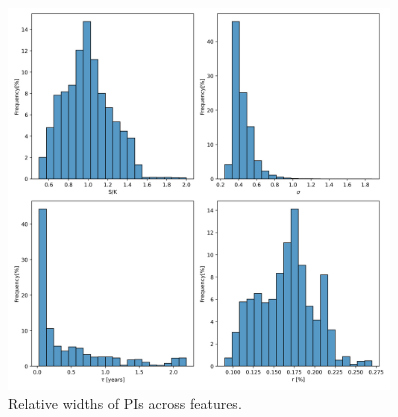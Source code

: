 \documentclass{article}
\theoremstyle{definition}
\begin{document}
\begin{figure}
\centering
\includegraphics[width=0.9\textwidth]{reports/figures/real_data_replication/real1_feature_distributions.png}
\caption{Relative widths of PIs across features.}
\label{fig:real1_features_dist}
\end{figure}
\end{document}
